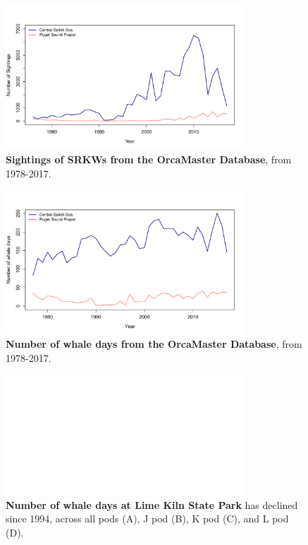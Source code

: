 \documentclass{article}
\begin{document}
\begin{figure}[p]
\includegraphics[width=0.8\textwidth]{../analyses/figures/OrcaPhenPlots/numsights_1976_2regs.pdf} 
\caption{\textbf{Sightings of SRKWs from the OrcaMaster Database}, from 1978-2017. }
\label{fig:sights}
\end{figure}

\begin{figure}[p]
\includegraphics[width=0.8\textwidth]{../analyses/figures/OrcaPhenPlots/whaledays_assumeSRKW2regs.pdf} 
\caption{\textbf{Number of whale days from the OrcaMaster Database}, from 1978-2017. }
\label{fig:wdays}
\end{figure}

\begin{figure}[p]
\includegraphics[width=0.8\textwidth]{../analyses/orcaphen/figures/whaledays_lime.png} 
\caption{\textbf{Number of whale days at Lime Kiln State Park} has declined since 1994, across all pods (A), J pod (B), K pod (C), and L pod (D). }
\label{fig:limewdays}
\end{figure}
\end{document}
